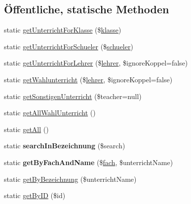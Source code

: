 \subsection*{Öffentliche, statische Methoden}
\begin{DoxyCompactItemize}
\item 
static \mbox{\hyperlink{class_schueler_unterricht_a7d858e9aa456de9903063c17c7b1f1cd}{get\+Unterricht\+For\+Klasse}} (\$\mbox{\hyperlink{classklasse}{klasse}})
\item 
static \mbox{\hyperlink{class_schueler_unterricht_a18c5343468e13b95314404b64dedc070}{get\+Unterricht\+For\+Schueler}} (\$\mbox{\hyperlink{classschueler}{schueler}})
\item 
static \mbox{\hyperlink{class_schueler_unterricht_ad4ae41f543fbf950087e62a2364f2709}{get\+Unterricht\+For\+Lehrer}} (\$\mbox{\hyperlink{classlehrer}{lehrer}}, \$ignore\+Koppel=false)
\item 
static \mbox{\hyperlink{class_schueler_unterricht_a92fb0cc62ae85aa88805ded1c635e691}{get\+Wahlunterricht}} (\$\mbox{\hyperlink{classlehrer}{lehrer}}, \$ignore\+Koppel=false)
\item 
static \mbox{\hyperlink{class_schueler_unterricht_ae13dabaca3bc47e628327535c446d22d}{get\+Sonstigen\+Unterricht}} (\$teacher=null)
\item 
static \mbox{\hyperlink{class_schueler_unterricht_ac3493503dbea444a63a49a17a58499b3}{get\+All\+Wahl\+Unterricht}} ()
\item 
static \mbox{\hyperlink{class_schueler_unterricht_a92763c50b3bb20caba9480fd61b0cfaa}{get\+All}} ()
\item 
\mbox{\label{class_schueler_unterricht_a8e0cfd476c720eb385df1468b45bd92f}} 
static {\bfseries search\+In\+Bezeichnung} (\$search)
\item 
\mbox{\label{class_schueler_unterricht_aef88440e72edd693b97e02f94d76035d}} 
static {\bfseries get\+By\+Fach\+And\+Name} (\$\mbox{\hyperlink{classfach}{fach}}, \$unterricht\+Name)
\item 
static \mbox{\hyperlink{class_schueler_unterricht_ac92f297147c2c13dae33b11d184892e5}{get\+By\+Bezeichnung}} (\$unterricht\+Name)
\item 
static \mbox{\hyperlink{class_schueler_unterricht_a2c494573c70fcd5405f9c21237115a74}{get\+By\+ID}} (\$id)
\end{DoxyCompactItemize}


